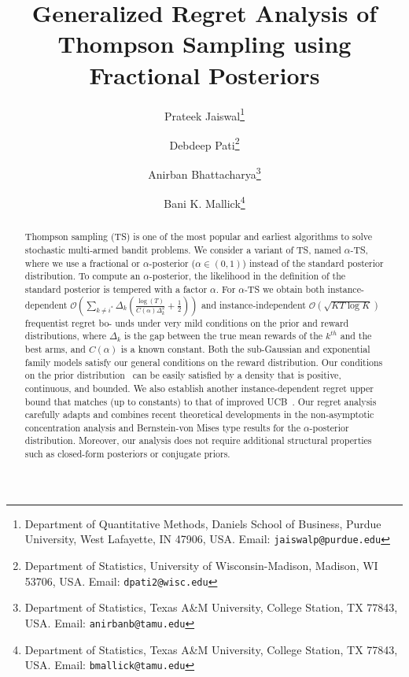 \documentclass[11pt]{article}
\begin{document}
\title{Generalized Regret Analysis of Thompson Sampling using Fractional Posteriors}

\author{%
Prateek Jaiswal\thanks{Department of Quantitative Methods, Daniels School of Business, Purdue University, West Lafayette, IN 47906, USA. Email: \texttt{jaiswalp@purdue.edu}}
\and
Debdeep Pati\thanks{Department of Statistics, University of Wisconsin-Madison, Madison, WI 53706, USA. Email: \texttt{dpati2@wisc.edu}}
\and
Anirban Bhattacharya\thanks{Department of Statistics, Texas A\&M University, College Station, TX 77843, USA. Email: \texttt{anirbanb@tamu.edu}}
\and
Bani K. Mallick\thanks{Department of Statistics, Texas A\&M University, College Station, TX 77843, USA. Email: \texttt{bmallick@tamu.edu}}
}
\date{}


\maketitle

\begin{abstract}
Thompson sampling (TS) is one of the most popular and earliest algorithms to solve stochastic multi-armed bandit problems. We consider a variant of TS, named $\alpha$-TS, where we use a fractional or $\alpha$-posterior ($\alpha\in(0,1)$) instead of the standard posterior distribution.  To compute an $\alpha$-posterior, the likelihood in the definition of the standard posterior is tempered with a factor $\alpha$. 
For $\alpha$-TS we obtain both instance-dependent \(\mathcal{O}\left(\sum_{k \neq i^*} \Delta_k\left(\frac{\log(T)}{C(\alpha)\Delta_k^2}  + \frac{1}{2} \right)\right)\) and instance-independent \(\mathcal{O}(\sqrt{KT\log K})\) frequentist regret 
bo- unds under very mild conditions on the prior and reward distributions,
where $\Delta_k$ is the gap between the true mean rewards of the $k^{th}$ and the best arms, and $C(\alpha)$ is a known constant. Both the sub-Gaussian and exponential family models satisfy our general conditions on the reward distribution. Our conditions on the prior distribution ~can be easily satisfied by a density  that is positive, continuous, and bounded. We also establish another instance-dependent regret upper bound %
that matches (up to constants) to that of improved UCB~\citep{Auer2010}. 
Our regret analysis carefully adapts and combines recent theoretical developments in the non-asymptotic concentration analysis and Bernstein-von Mises type results for the $\alpha$-posterior distribution.
  Moreover, our analysis does not require additional structural properties such as closed-form posteriors or conjugate priors.
\end{abstract}
\end{document}
